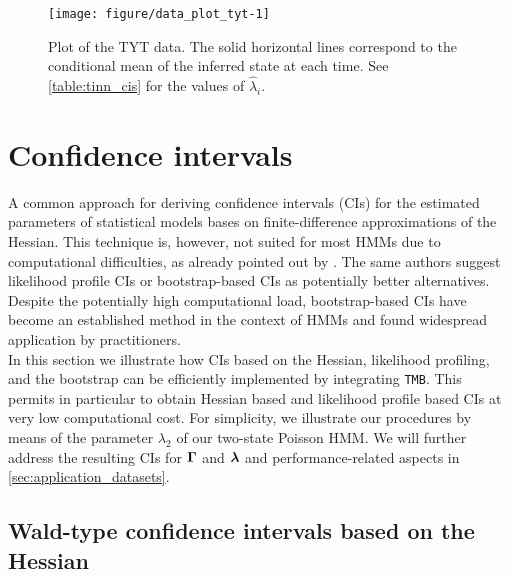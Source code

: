\documentclass[bimj,fleqn]{w-art}\usepackage[]{graphicx}\usepackage[]{color}
\makeatletter
\def\maxwidth{ %
  \ifdim\Gin@nat@width>\linewidth
    \linewidth
  \else
    \Gin@nat@width
  \fi
}
\newenvironment{knitrout}{}{} %
\newcommand{\bgamma}{\mbox{\boldmath $\Gamma$}}
\newcommand{\bflambda}{\mbox{\boldmath $\lambda$}}
\theoremstyle{plain}
\theoremstyle{definition}
\makeatother
\begin{document}
\begin{knitrout}
\color{fgcolor}\begin{figure}[htb]

{\centering \texttt{[image: figure/data\_plot\_tyt-1]} 

}

\caption{Plot of the TYT data. The solid horizontal lines correspond to the conditional mean of the inferred state at each time. See \autoref{table:tinn_cis} for the values of $\widehat{\lambda}_i$.}\label{fig:data_plot_tyt}
\end{figure}

\end{knitrout}



\section{Confidence intervals}
\label{sec:confint}

A common approach for deriving confidence intervals (CIs) for the estimated parameters of statistical models bases on finite-difference approximations of the Hessian. This technique is, however, not suited for most HMMs due to computational difficulties, as already pointed out by \citet{visser}. The same authors suggest likelihood profile CIs or bootstrap-based CIs as potentially better alternatives. Despite the potentially high computational load, bootstrap-based CIs have become an established method in the context of HMMs \citep{bulla, zucchini} and found widespread application by practitioners.\\
In this section we illustrate how CIs based on the Hessian, likelihood profiling, and the bootstrap can be efficiently implemented by integrating {\tt{TMB}}.
This permits in particular to obtain Hessian based and likelihood profile based CIs at very low computational cost. For simplicity, we illustrate our procedures by means of the parameter $\lambda_2$ of our two-state Poisson HMM. We will further address the resulting CIs for $\bgamma$ and $\bflambda$ and performance-related aspects in \autoref{sec:application_datasets}.


\subsection{Wald-type confidence intervals based on the Hessian}
\label{sec:hessian}
\end{document}
